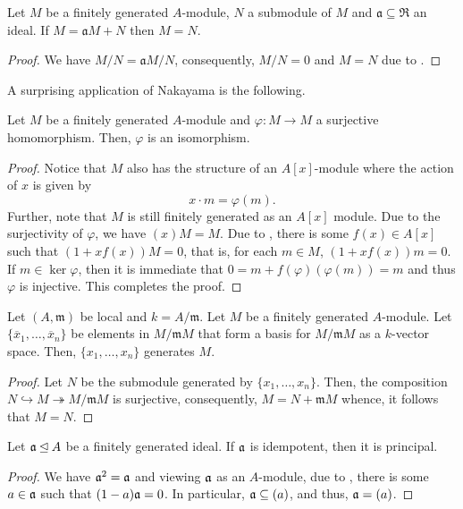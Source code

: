 \begin{corollary}
    Let $M$ be a finitely generated $A$-module, $N$ a submodule of $M$ and $\mathfrak a\subseteq\mathfrak R$ an ideal. If $M = \mathfrak aM + N$ then $M = N$.
\end{corollary}
\begin{proof}
    We have $M/N = \mathfrak aM/N$, consequently, $M/N = 0$ and $M = N$ due to .
\end{proof}

A surprising application of Nakayama is the following. 
\begin{proposition}
    Let $M$ be a finitely generated $A$-module and $\varphi: M\to M$ a surjective homomorphism. Then, $\varphi$ is an isomorphism.
\end{proposition}
\begin{proof}
    Notice that $M$ also has the structure of an $A[x]$-module where the action of $x$ is given by 
    \begin{equation*}
        x\cdot m = \varphi(m).
    \end{equation*}
    Further, note that $M$ is still finitely generated as an $A[x]$ module. Due to the surjectivity of $\varphi$, we have $(x)M = M$. Due to , there is some $f(x)\in A[x]$ such that $(1 + xf(x))M = 0$, that is, for each $m\in M$, $(1 + xf(x))m = 0$. If $m\in\ker\varphi$, then it is immediate that $0 = m + f(\varphi)(\varphi(m)) = m$ and thus $\varphi$ is injective. This completes the proof.
\end{proof}

\begin{lemma}
    Let $(A,\mathfrak m)$ be local and $k = A/\mathfrak m$. Let $M$ be a finitely generated $A$-module. Let $\{\overline x_1,\ldots,\overline x_n\}$ be elements in $M/\mathfrak mM$ that form a basis for $M/\mathfrak mM$ as a $k$-vector space. Then, $\{x_1,\ldots,x_n\}$ generates $M$.
\end{lemma}
\begin{proof}
    Let $N$ be the submodule generated by $\{x_1,\ldots,x_n\}$. Then, the composition $N\hookrightarrow M\twoheadrightarrow M/\mathfrak mM$ is surjective, consequently, $M = N + \mathfrak mM$ whence, it follows that $M = N$.
\end{proof}

\begin{proposition}
    Let $\mathfrak a\unlhd A$ be a finitely generated ideal. If $\mathfrak a$ is idempotent, then it is principal.
\end{proposition}
\begin{proof}
    We have $\mathfrak a^2 = \mathfrak a$ and viewing $\mathfrak a$ as an $A$-module, due to , there is some $a\in\mathfrak a$ such that $(1 - a)\mathfrak a = 0$. In particular, $\mathfrak a\subseteq(a)$, and thus, $\mathfrak a = (a)$.
\end{proof}

